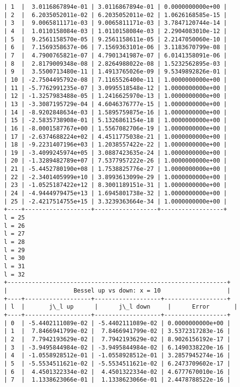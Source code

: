 \documentclass[9pt]{article}
\begin{document}
\begin{Verbatim}[commandchars=\\\{\}]
| 1  |  3.0116867894e-01 | 3.0116867894e-01 | 0.0000000000e+00 |
| 2  |  6.2035052011e-02 | 6.2035052011e-02 | 1.0626168585e-15 |
| 3  |  9.0065811171e-03 | 9.0065811171e-03 | 3.7847120744e-14 |
| 4  |  1.0110158084e-03 | 1.0110158084e-03 | 2.2904083010e-12 |
| 5  |  9.2561158570e-05 | 9.2561158611e-05 | 2.2147050060e-10 |
| 6  |  7.1569358637e-06 | 7.1569363101e-06 | 3.1183670799e-08 |
| 7  |  4.7900765821e-07 | 4.7901341987e-07 | 6.0141358091e-06 |
| 8  |  2.8179009348e-08 | 2.8264988022e-08 | 1.5232562895e-03 |
| 9  |  3.5500713480e-11 | 1.4913765026e-09 | 9.5349892826e-01 |
| 10 | -2.7504495792e-08 | 7.1165526400e-11 | 1.0000000000e+00 |
| 11 | -5.7762991235e-07 | 3.0995518548e-12 | 1.0000000000e+00 |
| 12 | -1.3257983488e-05 | 1.2416625970e-13 | 1.0000000000e+00 |
| 13 | -3.3087195729e-04 | 4.6046376777e-15 | 1.0000000000e+00 |
| 14 | -8.9202848634e-03 | 1.5895759875e-16 | 1.0000000000e+00 |
| 15 | -2.5835738908e-01 | 5.1326861154e-18 | 1.0000000000e+00 |
| 16 | -8.0001587767e+00 | 1.5567082706e-19 | 1.0000000000e+00 |
| 17 | -2.6374688224e+02 | 4.4511775038e-21 | 1.0000000000e+00 |
| 18 | -9.2231407196e+03 | 1.2038557422e-22 | 1.0000000000e+00 |
| 19 | -3.4099245974e+05 | 3.0887423635e-24 | 1.0000000000e+00 |
| 20 | -1.3289482789e+07 | 7.5377957222e-26 | 1.0000000000e+00 |
| 21 | -5.4452780190e+08 | 1.7538825776e-27 | 1.0000000000e+00 |
| 22 | -2.3401405999e+10 | 3.8993613099e-29 | 1.0000000000e+00 |
| 23 | -1.0525187422e+12 | 8.3001189151e-31 | 1.0000000000e+00 |
| 24 | -4.9444979475e+13 | 1.6945801738e-32 | 1.0000000000e+00 |
| 25 | -2.4217514755e+15 | 3.3239363664e-34 | 1.0000000000e+00 |
+----+-------------------+------------------+------------------+
l = 25
l = 26
l = 27
l = 28
l = 29
l = 30
l = 31
l = 32
+---------------------------------------------------------------+
|                   Bessel up vs down: x = 10                   |
+----+-------------------+-------------------+------------------+
| l  |       j\_l up      |      j\_l down     |      Error       |
+----+-------------------+-------------------+------------------+
| 0  | -5.4402111089e-02 | -5.4402111089e-02 | 0.0000000000e+00 |
| 1  |  7.8466941799e-02 |  7.8466941799e-02 | 3.5372317283e-16 |
| 2  |  7.7942193629e-02 |  7.7942193629e-02 | 8.9026156192e-17 |
| 3  | -3.9495844984e-02 | -3.9495844984e-02 | 6.1490338220e-16 |
| 4  | -1.0558928512e-01 | -1.0558928512e-01 | 3.2857945274e-16 |
| 5  | -5.5534511621e-02 | -5.5534511621e-02 | 6.2473709602e-17 |
| 6  |  4.4501322334e-02 |  4.4501322334e-02 | 4.6777670010e-16 |
| 7  |  1.1338623066e-01 |  1.1338623066e-01 | 2.4478788522e-16 |

\end{Verbatim}
\end{document}
